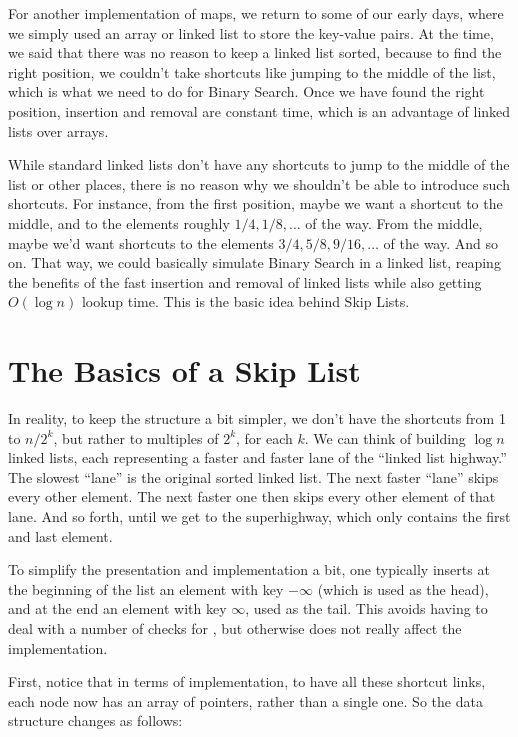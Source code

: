 For another implementation of maps, we return to some of our early
days, where we simply used an array or linked list to store the
key-value pairs. At the time, we said that there was no reason to keep
a linked list sorted, because to find the right position, we couldn't
take shortcuts like jumping to the middle of the list, which is what
we need to do for Binary Search. Once we have found the right
position, insertion and removal are constant time, which is an
advantage of linked lists over arrays.

While standard linked lists don't have any shortcuts to jump to the
middle of the list or other places, there is no reason why we
shouldn't be able to introduce such shortcuts. For instance, from the
first position, maybe we want a shortcut to the middle, and to the
elements roughly $1/4, 1/8, \ldots$ of the way. From the middle, maybe
we'd want shortcuts to the elements $3/4, 5/8, 9/16, \ldots$ of the
way. And so on. 
That way, we could basically simulate Binary Search in a linked list,
reaping the benefits of the fast insertion and removal of linked lists
while also getting $O(\log n)$ lookup time. This is the basic idea
behind Skip Lists.

\section{The Basics of a Skip List}
In reality, to keep the structure a bit simpler, we don't have the
shortcuts from 1 to $n/2^k$, but rather to multiples of $2^k$, for
each $k$. We can think of building $\log n$ linked lists, each
representing a faster and faster lane of the ``linked list highway.''
The slowest ``lane'' is the original sorted linked list.
The next faster ``lane'' skips every other element.
The next faster one then skips every other element of that lane. And
so forth, until we get to the superhighway, which only contains the
first and last element.

To simplify the presentation and implementation a bit, one typically
inserts at the beginning of the list an element with key $-\infty$
(which is used as the head), and at the end an element with key
$\infty$, used as the tail.
This avoids having to deal with a number of checks for ,
but otherwise does not really affect the implementation.

First, notice that in terms of implementation, to have all these
shortcut links, each node now has an array of  pointers,
rather than a single one. So the  data structure changes as
follows:

